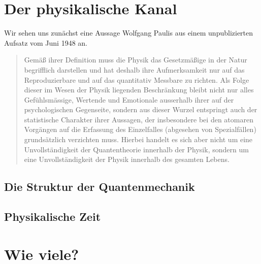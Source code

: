 \documentclass[12pt]{book}
\begin{document}
\chapter{Der physikalische Kanal}
Wir sehen uns zunächst eine Aussage Wolfgang Paulis aus einem unpublizierten Aufsatz vom Juni 1948 an.
\begin{quote}\begin{tcolorbox}
Gemäß ihrer Definition muss die Physik das Gesetzmäßige in der Natur begrifflich darstellen und hat deshalb ihre Aufmerksamkeit nur auf das Reproduzierbare und auf das quantitativ Messbare zu richten. Als Folge dieser im Wesen der Physik liegenden Beschränkung bleibt nicht nur alles Gefühlsmässige, Wertende und Emotionale ausserhalb ihrer auf der psychologischen Gegenseite, sondern aus dieser Wurzel entspringt auch der statistische Charakter ihrer Aussagen, der insbesondere bei den atomaren Vorgängen auf die Erfassung des Einzelfalles (abgesehen von Spezialfällen) grundsätzlich verzichten muss. Hierbei handelt es sich aber nicht um eine Unvollständigkeit der Quantentheorie innerhalb der Physik, sondern um eine Unvollständigkeit der Physik innerhalb des gesamten Lebens.
\end{tcolorbox}\end{quote}

\section{Die Struktur der Quantenmechanik}

\section{Physikalische Zeit}

\chapter{Wie viele?}
\end{document}

